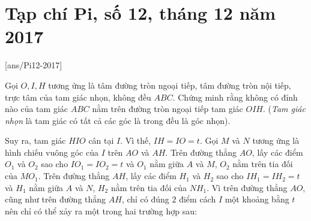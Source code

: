 \section{Tạp chí Pi, số 12,  tháng 12 năm 2017}
[ans/Pi12-2017]

\begin{bt}%
	Gọi $O,I,H$ tương ứng là tâm đường tròn ngoại tiếp, tâm đường tròn nội tiếp, trực tâm của tam giác nhọn, không đều $ABC$. Chứng minh rằng không có đỉnh nào của tam giác $ABC$ nằm trên đường tròn ngoại tiếp tam giác $OIH$. (\textit{Tam giác nhọn} là tam giác có tất cả các góc là trong đều là góc nhọn).
	\loigiai
	{
		\vspace{2ex}
		Suy ra, tam giác $HIO$ cân tại $I$. Vì thế, $IH=IO=t$.
		Gọi $M$ và $N$ tương ứng là hình chiếu vuông góc của $I$ trên $AO$ và $AH$.
		Trên đường thẳng $AO$, lấy các điểm $O_1$ và $O_2$ sao cho $IO_1=IO_2=t$ và $O_1$ nằm giữa $A$ và $M$, $O_2$ nằm trên tia đối của $MO_1$.
		Trên đường thẳng $AH$, lấy các điểm $H_1$ và $H_2$ sao cho $IH_1=IH_2=t$ và $H_1$ nằm giữa $A$ và $N$, $H_2$ nằm trên tia đối của $NH_1$.
		Vì trên đường thẳng $AO$, cũng như trên đường thẳng $AH$, chỉ có đúng $2$ điểm cách $I$ một khoảng bằng $t$ nên chỉ có thể xảy ra một trong hai trường hợp sau:
		\begin{itemize}

\end{itemize}}
\end{bt}
